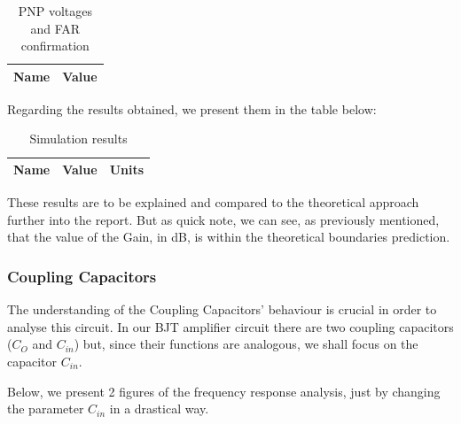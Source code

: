 \begin{table}[h]
    \centering
    \begin{tabular}{|c|c|}
    \hline
    {\bf Name} & {\bf Value} \\ \hline
    
    \end{tabular}
    \caption{PNP voltages and FAR confirmation}
    \label{tab:PNP}
\end{table}


Regarding the results obtained, we present them in the table below:

\begin{table}[h]
    \centering
    \begin{tabular}{|c|c|c|}
    \hline
    {\bf Name} & {\bf Value} & {\bf Units}\\ \hline
    
    \end{tabular}
    \caption{Simulation results}
    \label{tab:sim_results}
\end{table}

These results are to be explained and compared to the theoretical approach further into the report. But as quick note, we can see, as previously mentioned, that the value of the Gain, in dB, is within the theoretical boundaries prediction.


\subsubsection{Coupling Capacitors}

The understanding of the Coupling Capacitors' behaviour is crucial in order to analyse this circuit. In our BJT amplifier circuit there are two coupling capacitors ($C_O$ and $C_{in}$) but, since their functions are analogous, we shall focus on the capacitor $C_{in}$.

Below, we present 2 figures of the frequency response analysis, just by changing the parameter $C_{in}$ in a drastical way.

